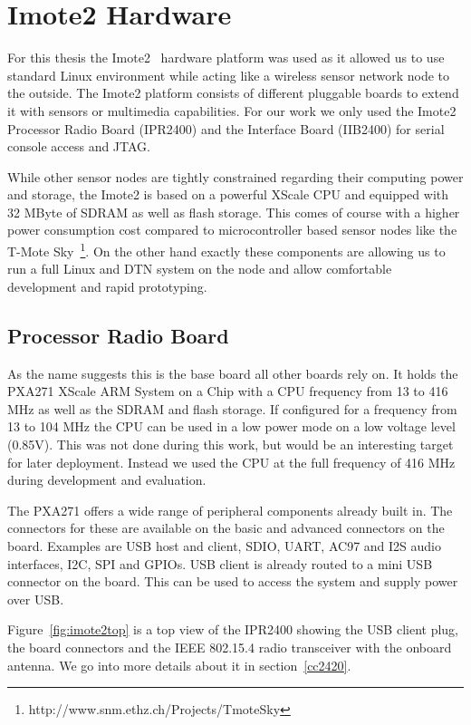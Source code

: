 \chapter{Imote2 Hardware}
For this thesis the Imote2~\cite{imote2} hardware platform was used as it allowed us to use
standard Linux environment while acting like a wireless sensor network node to
the outside. The Imote2 platform
consists of different pluggable boards to extend it with sensors or multimedia
capabilities. For our work we only used the Imote2 Processor Radio Board
(IPR2400) and the Interface Board (IIB2400) for serial console access and JTAG.

While other sensor nodes are tightly constrained regarding their computing power
and storage, the Imote2 is based on a powerful XScale CPU and equipped with 32
MByte of SDRAM as well as flash storage. This comes of course with a higher power
consumption cost compared to microcontroller based sensor nodes like the T-Mote
Sky~\footnote{http://www.snm.ethz.ch/Projects/TmoteSky}. On the other hand
exactly these components are allowing us to run a full
Linux and DTN system on the node and allow comfortable development and rapid
prototyping.

\section{Processor Radio Board}
As the name suggests this is the base board all other boards rely on. It holds
the PXA271 XScale ARM System on a Chip with a CPU frequency from 13 to 416 MHz
as well as the SDRAM and flash storage. If configured for a frequency from 13
to 104 MHz the CPU can be used in a low power mode on a low voltage level
(0.85V). This was not done during this work, but would be an interesting target
for later deployment. Instead we used the CPU at the full frequency of 416 MHz
during development and evaluation.

The PXA271 offers a wide range of peripheral components already built in. The
connectors for these are available on the basic and advanced connectors on the
board. Examples are USB host and client, SDIO, UART, AC97 and I2S audio
interfaces, I2C, SPI and GPIOs. USB client is already routed to a mini USB
connector on the board. This can be used to access the system and supply power
over USB.

Figure~\ref{fig:imote2top} is a top view of the IPR2400 showing the USB client plug,
the board connectors and the IEEE 802.15.4 radio transceiver with the onboard
antenna. We go into more details about it in section~\ref{cc2420}.

